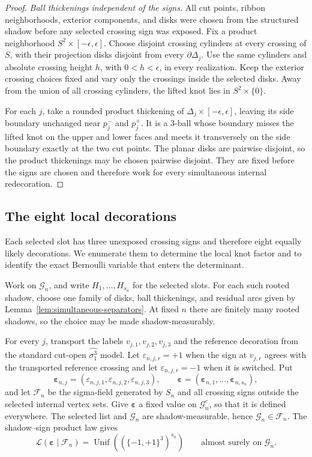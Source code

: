 \documentclass[9pt,twoside]{pnas-new}
\theoremstyle{definition}
\theoremstyle{remark}
\begin{document}
\begin{proof}
\emph{Ball thickenings independent of the signs.}
All cut points, ribbon neighborhoods, exterior components, and disks were chosen from the structured shadow before any selected crossing sign was exposed. Fix a product neighborhood $S^2\times[-\epsilon,\epsilon]$. Choose disjoint crossing cylinders at every crossing of $S$, with their projection disks disjoint from every $\partial\Delta_j$. Use the same cylinders and absolute crossing height $h$, with $0<h<\epsilon$, in every realization. Keep the exterior crossing choices fixed and vary only the crossings inside the selected disks. Away from the union of all crossing cylinders, the lifted knot lies in $S^2\times\{0\}$.

For each $j$, take a rounded product thickening of $\Delta_j\times[-\epsilon,\epsilon]$, leaving its side boundary unchanged near $p_j^-$ and $p_j^+$. It is a $3$-ball whose boundary misses the lifted knot on the upper and lower faces and meets it transversely on the side boundary exactly at the two cut points. The planar disks are pairwise disjoint, so the product thickenings may be chosen pairwise disjoint. They are fixed before the signs are chosen and therefore work for every simultaneous internal redecoration.
\end{proof}

\subsection{The eight local decorations}
Each selected slot has three unexposed crossing signs and therefore eight equally likely decorations. We enumerate them to determine the local knot factor and to identify the exact Bernoulli variable that enters the determinant.

Work on $\mathcal G_n$, and write $H_1,\ldots,H_{s_n}$ for the selected slots. For each such rooted shadow, choose one family of disks, ball thickenings, and residual arcs given by Lemma~\ref{lem:simultaneous-separators}. At fixed $n$ there are finitely many rooted shadows, so the choice may be made shadow-measurably.

For every $j$, transport the labels $v_{j,1},v_{j,2},v_{j,3}$ and the reference decoration from the standard cut-open $\widehat{\sigma_1^3}$ model. Let $\varepsilon_{n,j,r}=+1$ when the sign at $v_{j,r}$ agrees with the transported reference crossing and let $\varepsilon_{n,j,r}=-1$ when it is switched. Put
\[
 \boldsymbol\varepsilon_{n,j}=(\varepsilon_{n,j,1},\varepsilon_{n,j,2},\varepsilon_{n,j,3}),
 \qquad
 \boldsymbol\varepsilon=(\boldsymbol\varepsilon_{n,1},\ldots,\boldsymbol\varepsilon_{n,s_n}),
\]
and let $\mathcal F_n$ be the sigma-field generated by $S_n$ and all crossing signs outside the selected internal vertex sets. Give $\boldsymbol\varepsilon$ a fixed value on $\mathcal G_n^c$, so that it is defined everywhere. The selected list and $\mathcal G_n$ are shadow-measurable, hence $\mathcal G_n\in\mathcal F_n$. The shadow--sign product law gives
\begin{equation}
 \mathcal L(\boldsymbol\varepsilon\mid\mathcal F_n)
 =\operatorname{Unif}\!\left((\{-1,+1\}^3)^{s_n}\right)
 \qquad\text{almost surely on }\mathcal G_n.
 \label{eq:conditional-internal-sign-law}
\end{equation}
\end{document}
